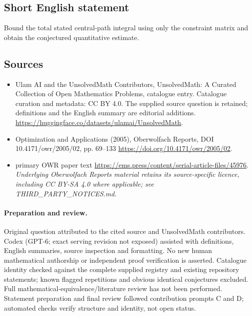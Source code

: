 \documentclass[11pt]{article}
\begin{document}
\subsection{Short English statement}
Bound the total stated central-path integral using only the constraint matrix and obtain the conjectured quantitative estimate.
\subsection{Sources}
\begin{itemize}
\item[\hypertarget{source:statement:1}{S1}] Ulam AI and the UnsolvedMath Contributors, UnsolvedMath: A Curated Collection of Open Mathematics Problems, catalogue entry. Catalogue curation and metadata: CC BY 4.0. The supplied source question is retained; definitions and the English summary are editorial additions.
\url{https://huggingface.co/datasets/ulamai/UnsolvedMath}.
\item[\hypertarget{source:statement:2}{S2}] Optimization and Applications (2005), Oberwolfach Reports, DOI 10.4171/owr/2005/02, pp. 69--133
\url{https://doi.org/10.4171/owr/2005/02}.
\item[\hypertarget{source:statement:3}{S3}] primary OWR paper text
\url{https://ems.press/content/serial-article-files/45976}.
\textit{Underlying Oberwolfach Reports material retains its source-specific licence, including CC BY-SA 4.0 where applicable; see THIRD\_PARTY\_NOTICES.md.}
\end{itemize}
\paragraph{Preparation and review.}
Original question attributed to the cited source and UnsolvedMath contributors. Codex (GPT-6; exact serving revision not exposed) assisted with definitions, English summaries, source inspection and formatting. No new human mathematical authorship or independent proof verification is asserted. Catalogue identity checked against the complete supplied registry and existing repository statements; known flagged repetitions and obvious identical conjectures excluded. Full mathematical-equivalence/literature review has not been performed. Statement preparation and final review followed contribution prompts C and D; automated checks verify structure and identity, not open status.
\label{end:statement}
\end{document}
